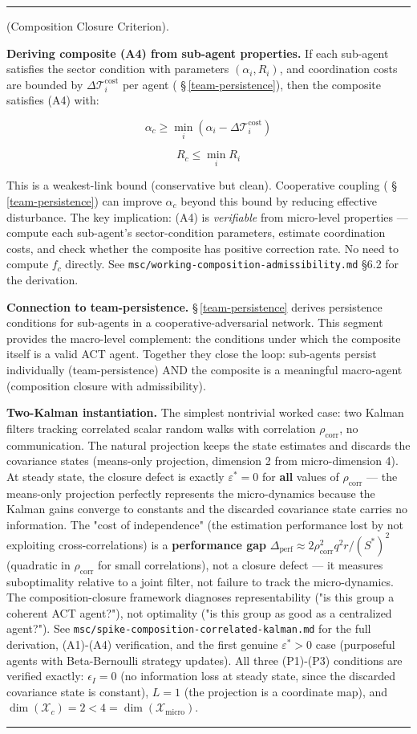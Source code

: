 \documentclass[11pt,oneside]{article}
\newcounter{claim}[section]
\renewcommand{\theclaim}{\thesection.\arabic{claim}}
\newenvironment{segment}[2]{%
  \refstepcounter{claim}%
  \bigskip\noindent\hrule\smallskip
  \noindent{\bfseries #1~\theclaim}\enskip(#2).\par\smallskip
  \noindent\ignorespaces
}{%
  \par\smallskip\noindent\hrule\bigskip
}
\newenvironment{formulation}[1][]{\begin{segment}{Formulation}{#1}}{\end{segment}}
\begin{document}
\begin{formulation}[Composition Closure Criterion]
\textbf{Deriving composite (A4) from sub-agent properties.} If each sub-agent satisfies the sector condition with parameters $(\alpha_i, R_i)$, and coordination costs are bounded by $\Delta\mathcal T_i^{\text{cost}}$ per agent ( \S\,\ref{team-persistence}), then the composite satisfies (A4) with:

$$\alpha_c \geq \min_i (\alpha_i - \Delta\mathcal T_i^{\text{cost}})$$

$$R_c \leq \min_i R_i$$

This is a weakest-link bound (conservative but clean). Cooperative coupling ( \S\,\ref{team-persistence}) can improve $\alpha_c$ beyond this bound by reducing effective disturbance. The key implication: (A4) is \textit{verifiable} from micro-level properties — compute each sub-agent's sector-condition parameters, estimate coordination costs, and check whether the composite has positive correction rate. No need to compute $f_c$ directly. See \texttt{msc/working-composition-admissibility.md} §6.2 for the derivation.

\textbf{Connection to team-persistence.} \S\,\ref{team-persistence} derives persistence conditions for sub-agents in a cooperative-adversarial network. This segment provides the macro-level complement: the conditions under which the composite itself is a valid ACT agent. Together they close the loop: sub-agents persist individually (team-persistence) AND the composite is a meaningful macro-agent (composition closure with admissibility).

\textbf{Two-Kalman instantiation.} The simplest nontrivial worked case: two Kalman filters tracking correlated scalar random walks with correlation $\rho_{\text{corr}}$, no communication. The natural projection keeps the state estimates and discards the covariance states (means-only projection, dimension 2 from micro-dimension 4). At steady state, the closure defect is exactly $\varepsilon^* = 0$ for \textbf{all} values of $\rho_{\text{corr}}$ — the means-only projection perfectly represents the micro-dynamics because the Kalman gains converge to constants and the discarded covariance state carries no information. The "cost of independence" (the estimation performance lost by not exploiting cross-correlations) is a \textbf{performance gap} $\Delta_{\text{perf}} \approx 2\rho_{\text{corr}}^2 q^2 r / (S^*)^2$ (quadratic in $\rho_{\text{corr}}$ for small correlations), not a closure defect — it measures suboptimality relative to a joint filter, not failure to track the micro-dynamics. The composition-closure framework diagnoses representability ("is this group a coherent ACT agent?"), not optimality ("is this group as good as a centralized agent?"). See \texttt{msc/spike-composition-correlated-kalman.md} for the full derivation, (A1)-(A4) verification, and the first genuine $\varepsilon^* > 0$ case (purposeful agents with Beta-Bernoulli strategy updates). All three (P1)-(P3) conditions are verified exactly: $\epsilon_I = 0$ (no information loss at steady state, since the discarded covariance state is constant), $L = 1$ (the projection is a coordinate map), and $\dim(\mathcal X_c) = 2 < 4 = \dim(\mathcal X_{\text{micro}})$.


\end{formulation}
\end{document}

